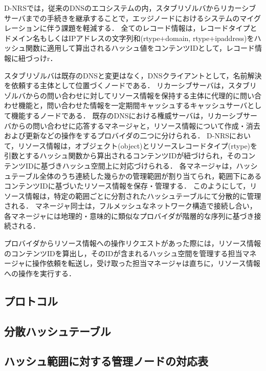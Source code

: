 D-NRSでは，従来のDNSのエコシステムの内，スタブリゾルバからリカーシブサーバまでの手続きを継承することで，エッジノードにおけるシステムのマイグレーションに伴う課題を軽減する．
全てのレコード情報は，レコードタイプとドメイン名もしくはIPアドレスの文字列和(rtype+domain, rtype+ipaddress)をハッシュ関数に適用して算出されるハッシュ値をコンテンツIDとして，レコード情報に紐づっけr．




スタブリゾルバは既存のDNSと変更はなく，DNSクライアントとして，名前解決を依頼する主体として位置づくノードである．
リカーシブサーバは，スタブリゾルバからの問い合わせに対してリソース情報を保持する主体に代理的に問い合わせ機能と，問い合わせた情報を一定期間キャッシュするキャッシュサーバとして機能するノードである．
既存のDNSにおける権威サーバは，リカーシブサーバからの問い合わせに応答するマネージャと，リソース情報について作成・消去および更新などの操作をするプロバイダの二つに分けられる．
D-NRSにおいて，リソース情報は，オブジェクト(object)とリソースレコードタイプ(rtype)を引数とするハッシュ関数から算出されるコンテンツIDが紐づけられ，そのコンテンツIDに基づきハッシュ空間上に対応づけられる．
各マネージャは，ハッシュテーブル全体のうち連続した幾らかの管理範囲が割り当てられ，範囲下にあるコンテンツIDに基づいたリソース情報を保存・管理する．
このようにして，リソース情報は，特定の範囲ごとに分割されたハッシュテーブルにて分散的に管理される．
マネージャ同士は，フルメッシュなネットワーク構造で接続し合い，各マネージャには地理的・意味的に類似なプロバイダが階層的な序列に基づき接続される．

プロバイダからリソース情報への操作リクエストがあった際には，リソース情報のコンテンツIDを算出し，そのIDが含まれるハッシュ空間を管理する担当マネージャに操作依頼を転送し，受け取った担当マネージャは直ちに，リソース情報への操作を実行する．




\subsection{プロトコル}
\subsection{分散ハッシュテーブル}
\subsection{ハッシュ範囲に対する管理ノードの対応表}
